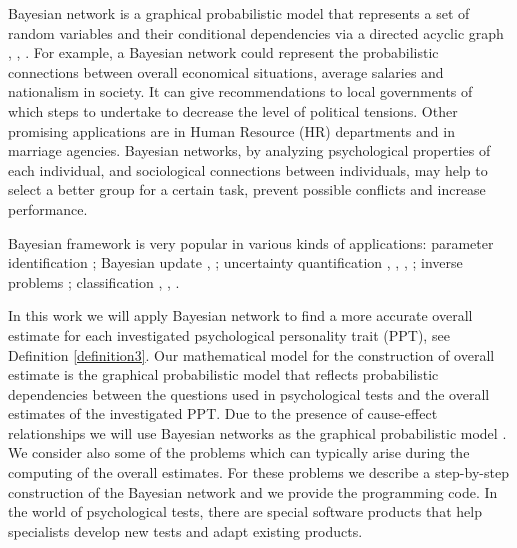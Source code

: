 \documentclass[12pt]{article}
\begin{document}
Bayesian network is a graphical probabilistic model that represents a set of random variables and their conditional dependencies via a directed acyclic graph \cite{BenGal08},
\cite{Pourret08}, \cite{Albert:09}. 
For example, a Bayesian network could represent the probabilistic connections between overall economical situations, average salaries and nationalism in society. It can give recommendations to local governments of which steps to undertake to decrease the level of political tensions. Other promising applications are in Human Resource (HR) departments and in marriage agencies. Bayesian networks, by analyzing psychological properties of each individual, and sociological connections between individuals, may help to select a better group for a certain task, prevent possible conflicts and increase performance.

Bayesian framework is very popular in various kinds of applications: parameter identification \cite{matthies2016parameter}; Bayesian update  \cite{matthies2016bayesian}, \cite{Rosic2013}; uncertainty quantification \cite{rosic2012sampling}, \cite{rosic2011direct}, \cite{pajonk2012deterministic}, \cite{UQLitvinenko12}; inverse problems \cite{hermann2016inverse}; classification \cite{berikov2003influence}, \cite{berikov2003methods}, \cite{berikov2004discrete}.

In this work we will apply Bayesian network \cite{Albert:09} to find a more accurate overall estimate for each investigated psychological personality trait (PPT), see Definition \ref{definition3}. Our mathematical model for the construction of overall estimate is the graphical probabilistic model that reflects probabilistic dependencies between the questions used in psychological tests and the overall estimates of the investigated PPT. Due to the presence of cause-effect relationships we will use Bayesian networks as the graphical probabilistic model \cite{Tu:06}. We consider also some of the problems which can typically arise during the computing of the overall estimates. For these problems we describe a step-by-step construction of the Bayesian network and we provide the programming code.
In the world of psychological tests, there are special software products that help specialists develop new tests and adapt existing products.
\end{document}
